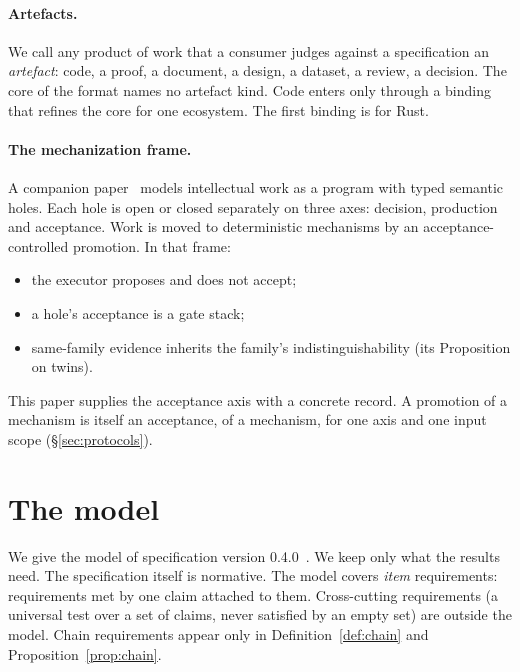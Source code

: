 \documentclass[11pt]{article}
\theoremstyle{definition}
\theoremstyle{remark}
\begin{document}
\paragraph{Artefacts.} We call any product of work that a consumer judges against a
specification an \emph{artefact}: code, a proof, a document, a design, a dataset, a review, a
decision. The core of the format names no artefact kind. Code enters only through a binding that
refines the core for one ecosystem. The first binding is for Rust.

\paragraph{The mechanization frame.} A companion paper~\cite{matijasevic2026psm} models
intellectual work as a program with typed semantic holes. Each hole is open or closed separately on
three axes: decision, production and acceptance. Work is moved to deterministic mechanisms by an
acceptance-controlled promotion. In that frame:
\begin{itemize}[itemsep=1pt]
\item the executor proposes and does not accept;
\item a hole's acceptance is a gate stack;
\item same-family evidence inherits the family's indistinguishability (its Proposition on twins).
\end{itemize}
This paper supplies the acceptance axis with a concrete record. A promotion of a mechanism is
itself an acceptance, of a mechanism, for one axis and one input scope (§\ref{sec:protocols}).

\section{The model}\label{sec:model}

We give the model of specification version 0.4.0~\cite{acceptance040}. We keep only what the
results need. The specification itself is normative. The model covers \emph{item} requirements:
requirements met by one claim attached to them. Cross-cutting requirements (a universal test over a
set of claims, never satisfied by an empty set) are outside the model. Chain requirements appear
only in Definition~\ref{def:chain} and Proposition~\ref{prop:chain}.
\end{document}
